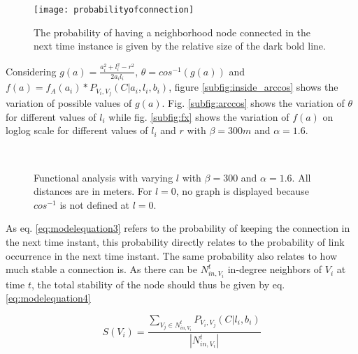 \documentclass[preprint, twocolumn,5p]{elsarticle}
\begin{document}
\begin{figure}
    \centering
    \texttt{[image: probabilityofconnection]}
    \caption{The probability of having a neighborhood node connected in the next time instance is given by the relative size of the dark bold line.}
    \label{fig:probabilityofconnection}
\end{figure}

Considering $g(a)=\frac{a_{i}^{2}+l_{i}^{2}-r^{2}}{2a_{i}l_{i}}$, $\theta=cos^{-1}(g(a))$ and $f(a)=f_{A}(a_{i})*P_{V_{i},V_{j}}(C|a_{i},l_{i},b_{i})$, figure \ref{subfig:inside_arccos} shows the variation of possible values of $g(a)$. Fig. \ref{subfig:arccos} shows the variation of $\theta$ for different values of $l_{i}$ while fig. \ref{subfig:fx} shows the variation of $f(a)$ on loglog scale for different values of $l_{i}$ and $r$ with $\beta=300m$ and $\alpha=1.6$.

\begin{figure}
    \centering
    \mbox
    {
    }
    \mbox
    {
    }
    \mbox
    {
    }
    \caption{Functional analysis with varying $l$ with $\beta=300$ and $\alpha=1.6$. All distances are in meters. For $l=0$, no graph is displayed because $cos^{-1}$ is not defined at $l=0$.}
    \label{fig:analysisprob}
\end{figure}

As eq. \ref{eq:modelequation3} refers to the probability of keeping the connection in the next time instant, this probability directly relates to the probability of link occurrence in the next time instant. The same probability also relates to how much stable a connection is. As there can be $N_{in,V_{i}}^{t}$ in-degree neighbors of $V_{i}$ at time $t$, the total stability of the node should thus be given by eq. \ref{eq:modelequation4}

\begin {equation}\label{eq:modelequation4}
S(V_{i})=\frac{\sum \limits _{V_{j}\in N_{in,V_{i}}^{t}}P_{V_{i},V_{j}}(C|l_{i},b_{i})}{|N_{in,V_{i}}^{t}|}
\end{equation}
\end{document}
